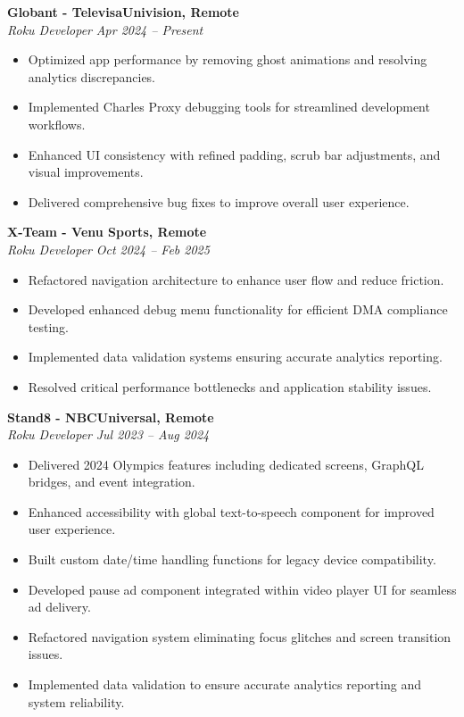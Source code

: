 \documentclass[11pt,a4paper]{article}
\newlength{\jobspacing}
\begin{document}
\textbf{Globant - TelevisaUnivision, Remote} \\
\emph{Roku Developer} \hfill \textit{Apr 2024 -- Present} \\
\begin{itemize}[leftmargin=*]
    \item Optimized app performance by removing ghost animations and resolving analytics discrepancies.
    \item Implemented Charles Proxy debugging tools for streamlined development workflows.
    \item Enhanced UI consistency with refined padding, scrub bar adjustments, and visual improvements.
    \item Delivered comprehensive bug fixes to improve overall user experience.
\end{itemize}

\vspace{\jobspacing}

\textbf{X-Team - Venu Sports, Remote} \\
\emph{Roku Developer} \hfill \textit{Oct 2024 -- Feb 2025} \\
\begin{itemize}[leftmargin=*]
    \item Refactored navigation architecture to enhance user flow and reduce friction.
    \item Developed enhanced debug menu functionality for efficient DMA compliance testing.
    \item Implemented data validation systems ensuring accurate analytics reporting.
    \item Resolved critical performance bottlenecks and application stability issues.
\end{itemize}

\vspace{\jobspacing}

\textbf{Stand8 - NBCUniversal, Remote} \\
\emph{Roku Developer} \hfill \textit{Jul 2023 -- Aug 2024} \\
\begin{itemize}[leftmargin=*]
    \item Delivered 2024 Olympics features including dedicated screens, GraphQL bridges, and event integration.
    \item Enhanced accessibility with global text-to-speech component for improved user experience.
    \item Built custom date/time handling functions for legacy device compatibility.
    \item Developed pause ad component integrated within video player UI for seamless ad delivery.
    \item Refactored navigation system eliminating focus glitches and screen transition issues.
    \item Implemented data validation to ensure accurate analytics reporting and system reliability.
\end{itemize}
\end{document}
